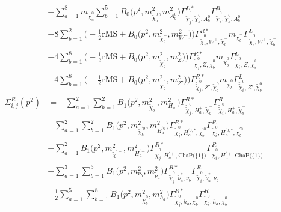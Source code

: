 \begin{itemize}
\begin{align}
 &+\sum_{a=1}^{8}m_{\tilde{\chi}^0_{{a}}} \sum_{b=1}^{5}{B_0\Big(p^{2},m^2_{\tilde{\chi}^0_{{a}}},m^2_{A^0_{{b}}}\Big)} {\Gamma^{L*}_{\check{\tilde{\chi}}^0_{{j}},\tilde{\chi}^0_{{a}},A^0_{{b}}}} {\Gamma^R_{\check{\tilde{\chi}}^0_{{i}},\tilde{\chi}^0_{{a}},A^0_{{b}}}}  \nonumber \\ 
 &-8 \sum_{b=1}^{2}\Big(-\frac{1}{2} \text{rMS}  + {B_0\Big(p^{2},m^2_{\tilde{\chi}^-_{{b}}},m^2_{W^-}\Big)}\Big){\Gamma^{R*}_{\check{\tilde{\chi}}^0_{{j}},W^+,\tilde{\chi}^-_{{b}}}} m_{\tilde{\chi}^-_{{b}}} {\Gamma^L_{\check{\tilde{\chi}}^0_{{i}},W^+,\tilde{\chi}^-_{{b}}}}  \nonumber \\ 
 &-4 \sum_{b=1}^{8}\Big(-\frac{1}{2} \text{rMS}  + {B_0\Big(p^{2},m^2_{\tilde{\chi}^0_{{b}}},m^2_{Z}\Big)}\Big){\Gamma^{R*}_{\check{\tilde{\chi}}^0_{{j}},Z,\tilde{\chi}^0_{{b}}}} m_{\tilde{\chi}^0_{{b}}} {\Gamma^L_{\check{\tilde{\chi}}^0_{{i}},Z,\tilde{\chi}^0_{{b}}}}  \nonumber \\ 
 &-4 \sum_{b=1}^{8}\Big(-\frac{1}{2} \text{rMS}  + {B_0\Big(p^{2},m^2_{\tilde{\chi}^0_{{b}}},m^2_{{Z'}}\Big)}\Big){\Gamma^{R*}_{\check{\tilde{\chi}}^0_{{j}},{Z'},\tilde{\chi}^0_{{b}}}} m_{\tilde{\chi}^0_{{b}}} {\Gamma^L_{\check{\tilde{\chi}}^0_{{i}},{Z'},\tilde{\chi}^0_{{b}}}}  \\ 
\Sigma^R_{i,j}(p^2) &= - \sum_{a=1}^{2}\sum_{b=1}^{2}{B_1\Big(p^{2},m^2_{\tilde{\chi}^-_{{b}}},m^2_{H^-_{{a}}}\Big)} {\Gamma^{R*}_{\check{\tilde{\chi}}^0_{{j}},H^+_{{a}},\tilde{\chi}^-_{{b}}}} {\Gamma^R_{\check{\tilde{\chi}}^0_{{i}},H^+_{{a}},\tilde{\chi}^-_{{b}}}}  \nonumber \\ 
 &- \sum_{a=1}^{2}\sum_{b=1}^{2}{B_1\Big(p^{2},m^2_{\tilde{\chi}^{'0}_{{b}}},m^2_{H^{'0}_{{a}}}\Big)} {\Gamma^{R*}_{\check{\tilde{\chi}}^0_{{j}},H^{{'0},*}_{{a}},\tilde{\chi}^{'0}_{{b}}}} {\Gamma^R_{\check{\tilde{\chi}}^0_{{i}},H^{{'0},*}_{{a}},\tilde{\chi}^{'0}_{{b}}}}  \nonumber \\ 
 &- \sum_{a=1}^{2}{B_1\Big(p^{2},m^2_{\tilde{\chi}^{'-}},m^2_{H^{'-}_{{a}}}\Big)} {\Gamma^{R*}_{\check{\tilde{\chi}}^0_{{j}},H^{'+}_{{a}},\text{ChaP}\Big(\{1\}\Big)}} {\Gamma^R_{\check{\tilde{\chi}}^0_{{i}},H^{'+}_{{a}},\text{ChaP}\Big(\{1\}\Big)}}  \nonumber \\ 
 &- \sum_{a=1}^{3}\sum_{b=1}^{3}{B_1\Big(p^{2},m^2_{\nu_{{b}}},m^2_{\tilde{\nu}_{{a}}}\Big)} {\Gamma^{R*}_{\check{\tilde{\chi}}^0_{{j}},\tilde{\nu}^*_{{a}},\nu_{{b}}}} {\Gamma^R_{\check{\tilde{\chi}}^0_{{i}},\tilde{\nu}^*_{{a}},\nu_{{b}}}}  \nonumber \\ 
 &-\frac{1}{2} \sum_{a=1}^{5}\sum_{b=1}^{8}{B_1\Big(p^{2},m^2_{\tilde{\chi}^0_{{b}}},m^2_{h_{{a}}}\Big)} {\Gamma^{R*}_{\check{\tilde{\chi}}^0_{{j}},h_{{a}},\tilde{\chi}^0_{{b}}}} {\Gamma^R_{\check{\tilde{\chi}}^0_{{i}},h_{{a}},\tilde{\chi}^0_{{b}}}}  \nonumber \\ 

\end{align}
\end{itemize}
